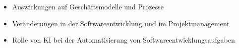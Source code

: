 \begin{itemize}
    \item Auswirkungen auf Geschäftsmodelle und Prozesse
    \item Veränderungen in der Softwareentwicklung und im Projektmanagement
    \item Rolle von KI bei der Automatisierung von Softwareentwicklungsaufgaben
\end{itemize}